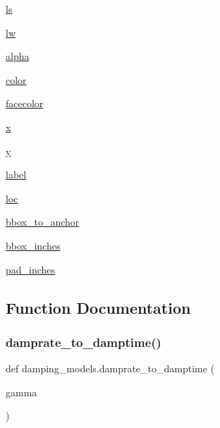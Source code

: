\begin{DoxyCompactItemize}
$$\item 
\hyperlink{namespacedamping__models_aa459d979864fda03e474c17eceafb11e}{ls}
\item 
\hyperlink{namespacedamping__models_acc3f2fd8e2050ca790052ca25222fcde}{lw}
\item 
\hyperlink{namespacedamping__models_a12759dcbb254e93503e78397e053b7b6}{alpha}
\item 
\hyperlink{namespacedamping__models_ada15223206a55c619904d093f03faec2}{color}
\item 
\hyperlink{namespacedamping__models_afb27afc9db4d58b425db77e3e21bc561}{facecolor}
\item 
\hyperlink{namespacedamping__models_a89e52e6ed35836d13426c69bfb74db59}{x}
\item 
\hyperlink{namespacedamping__models_a1492d9e1b4cd4f3bb6f57f6e7a892e08}{y}
\item 
\hyperlink{namespacedamping__models_af1c2b897a794e26cbac36846fa4ffc12}{label}
\item 
\hyperlink{namespacedamping__models_ace53aa65eae9fd138a8b1b0823897925}{loc}
\item 
\hyperlink{namespacedamping__models_a7b9f8978e3e936f2dfb6ed47dbd722cc}{bbox\+\_\+to\+\_\+anchor}
\item 
\hyperlink{namespacedamping__models_a139d3c226404875841f2e82b34320829}{bbox\+\_\+inches}
\item 
\hyperlink{namespacedamping__models_a1037bc0fc2f77ff8f2c9191aa4063a5a}{pad\+\_\+inches}
\end{DoxyCompactItemize}


\subsection{Function Documentation}
\mbox{\label{namespacedamping__models_a6c45de9ee4907b632137bd3968434c8f}} 
\subsubsection{\texorpdfstring{damprate\+\_\+to\+\_\+damptime()}{damprate\_to\_damptime()}}
{\footnotesize\ttfamily def damping\+\_\+models.\+damprate\+\_\+to\+\_\+damptime (\begin{DoxyParamCaption}\item[{}]{gamma }\end{DoxyParamCaption})}



